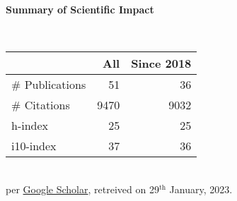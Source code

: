 \headedsection %
{\bf Summary of Scientific Impact}{}{}
{
    \qquad~~~~
    \begin{minipage}[t]{0.6\textwidth}
        \begin{tabular}{lrr}
        \hline
         & All & Since 2018\\
        \hline
        \# Publications & 51    & 36    \\
        \# Citations    & 9470  & 9032  \\
        h-index         & 25    & 25    \\
        i10-index       & 37    & 36    \\
        \hline
    \end{tabular}
    \\
    {\footnotesize{
        per \href{https://scholar.google.com/citations?user=wpLQuroAAAAJ}{Google Scholar},
        retreived on 29$^\text{th}$ January, 2023.
        }
    }
    \end{minipage}
     
}